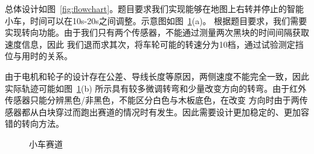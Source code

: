\documentclass[a4paper,twoside,zihao=5,UTF8]{ctexart}
\begin{document}
\begin{spacing}{1.2}
总体设计如图~\ref{fig:flowchart}。题目要求我们实现能够在地图上右转并停止的智能小车，时间可以在10s-20s之间调整。示意图如图~\ref{fig:car}(a)。
根据题目要求，我们需要实现转向功能。由于我们只有两个传感器，不能通过测量两次黑块的时间间隔获取速度信息，因此
我们退而求其次，将车轮可能的转速分为10档，通过试验测定挡位与用时的关系。

由于电机和轮子的设计存在公差、导线长度等原因，两侧速度不能完全一致，因此实际轨迹可能如图~\ref{fig:car}(b)
所示具有较多微调转弯和少量改变方向的转弯。由于红外传感器只能分辨黑色/非黑色，不能区分白色与木板底色，在改变
方向时由于两传感器都从白块穿过而跑出赛道的情况时有发生。因此需要设计更加稳定的、更加容错的转向方法。


\begin{figure}[htb]
    \centering
	\caption{小车赛道}
	\label{fig:car}
\end{figure}


\end{spacing}
\end{document}
